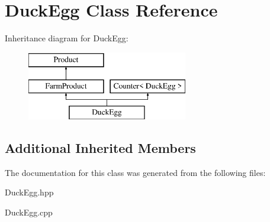 \hypertarget{class_duck_egg}{}\section{Duck\+Egg Class Reference}
\label{class_duck_egg}
Inheritance diagram for Duck\+Egg\+:\begin{figure}[H]
\begin{center}
\leavevmode
\includegraphics[height=3.000000cm]{class_duck_egg}
\end{center}
\end{figure}
\subsection*{Additional Inherited Members}


The documentation for this class was generated from the following files\+:\begin{DoxyCompactItemize}
\item 
Duck\+Egg.\+hpp\item 
Duck\+Egg.\+cpp\end{DoxyCompactItemize}
